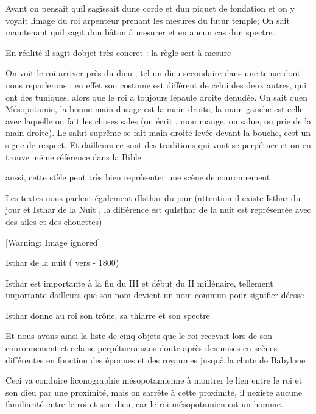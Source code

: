 \documentclass{article}
\begin{document}
Avant on pensait qu{\textquotesingle}il s{\textquotesingle}agissait
d{\textquotesingle}une corde et d{\textquotesingle}un piquet de
fondation et on y voyait l{\textquotesingle}image du roi arpenteur
prenant les mesures du futur temple; On sait maintenant
qu{\textquotesingle}il s{\textquotesingle}agit d{\textquotesingle}un
bâton à mesurer et en aucun cas  d{\textquotesingle}un spectre.

En réalité il s{\textquotesingle}agit d{\textquotesingle}objet très
concret : la règle sert à mesure

On voit le roi arriver près du dieu , tel un dieu secondaire dans une
tenue dont nous reparlerons  : en effet son costume est différent de
celui des deux autres, qui ont des tuniques, alors que le roi  a
toujours l{\textquotesingle}épaule droite dénudée. On sait
qu{\textquotesingle}en Mésopotamie, la bonne main
d{\textquotesingle}usage est la main droite, la main gauche est celle
avec laquelle on fait les choses sales (on écrit , mon mange, on salue,
on prie de la  main droite). Le salut suprême se fait main droite levée
devant la bouche, c{\textquotesingle}est un signe de respect. Et
d{\textquotesingle}ailleurs ce sont des traditions qui vont se
perpétuer et on en trouve même référence dans la Bible

aussi, cette stèle peut très bien représenter une scène de couronnement

Les textes nous parlent également d{\textquotesingle}Isthar  du jour
(attention il existe Isthar du jour et Isthar de la Nuit , la
différence est qu{\textquotesingle}Isthar de la nuit est représentée
avec des ailes et des chouettes)

  [Warning: Image ignored] %
 

Isthar de la nuit ( vers - 1800)\ \ 

Isthar est importante à la fin du III et début du II millénaire,
tellement importante d{\textquotesingle}ailleurs que son nom devient un
nom commun pour signifier déesse

Isthar donne au roi son trône, sa thiarre et son spectre 

Et nous avons ainsi la liste de cinq objets que le roi recevait lors de
son couronnement et cela se  perpétuera sans doute après des mises en
scènes différentes en fonction des époques et des royaumes
jusqu{\textquotesingle}à la chute de Babylone

Ceci va conduire l{\textquotesingle}iconographie mésopotamienne à
montrer le lien entre le roi et son dieu par une proximité, mais on
s{\textquotesingle}arrête à cette proximité, il
n{\textquotesingle}existe aucune familiarité entre le roi et son dieu,
car le roi mésopotamien est un homme.
\end{document}
